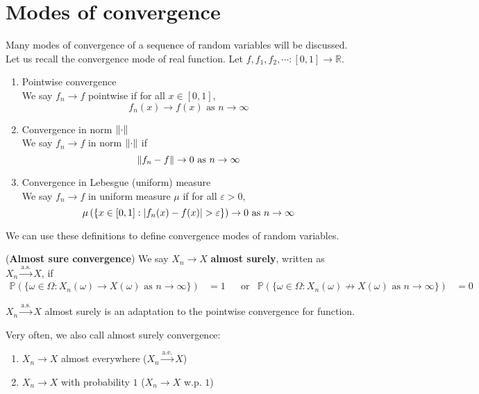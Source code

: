 \documentclass{huhtakm-template-book}
\newcommand{\prob}{\mathbb{P}}
\begin{document}
\section{Modes of convergence}
Many modes of convergence of a sequence of random variables will be discussed.\\
Let us recall the convergence mode of real function. Let $f,f_{1},f_{2},\cdots:[0,1]\to\mathbb{R}$.
\begin{enumerate}
	\item Pointwise convergence\\
	We say $f_{n}\to f$ pointwise if for all $x\in[0,1]$,
	\begin{equation*}
		f_{n}(x)\to f(x)\text{ as }n\to\infty
	\end{equation*}
	\item Convergence in norm $\lVert{\cdot}\rVert$\\
	We say $f_{n}\to f$ in norm $\lVert{\cdot}\rVert$ if
	\begin{equation*}
		\lVert{f_{n}-f}\rVert\to 0\text{ as }n\to\infty
	\end{equation*}
	\item Convergence in Lebesgue (uniform) measure\\
	We say $f_{n}\to f$ in uniform measure $\mu$ if for all $\varepsilon>0$,
	\begin{equation*}
		\mu\left(\{x\in[0,1]:\abs{f_{n}(x)-f(x)}>\varepsilon\}\right)\to 0\text{ as }n\to\infty
	\end{equation*}
\end{enumerate}
We can use these definitions to define convergence modes of random variables.
\begin{defn}(\textbf{Almost sure convergence})
	We say $X_{n}\to X$ \textbf{almost surely}, written as $X_{n}\xrightarrow{\text{a.s.}}X$, if
	\begin{align*}
		\prob(\{\omega\in\Omega:X_{n}(\omega)\to X(\omega)\text{ as }n\to\infty\})&=1 & &\text{or} & \prob(\{\omega\in\Omega:X_{n}(\omega)\not\to X(\omega)\text{ as }n\to\infty\})&=0
	\end{align*}
\end{defn}
\begin{rem}
	$X_{n}\xrightarrow{\text{a.s.}}X$ almost surely is an adaptation to the pointwise convergence for function.
\end{rem}
\begin{rem}
	Very often, we also call almost surely convergence:
	\begin{enumerate}
		\item $X_{n}\to X$ almost everywhere ($X_{n}\xrightarrow{\text{a.e.}}X$)
		\item $X_{n}\to X$ with probability $1$ ($X_{n}\to X$ w.p. $1$)
	\end{enumerate}
\end{rem}
\end{document}
